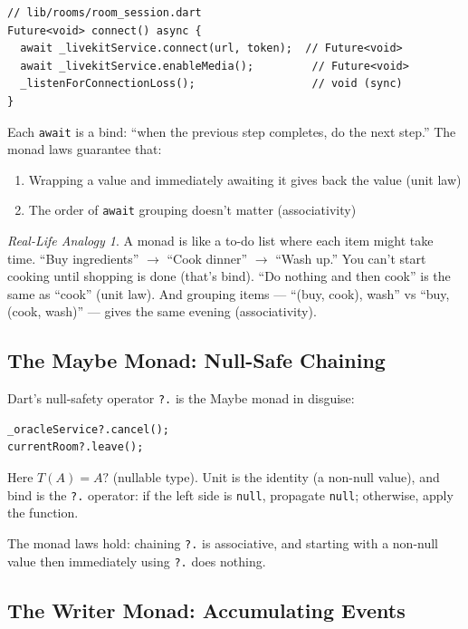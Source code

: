 \documentclass[12pt,a4paper]{article}
\theoremstyle{definition}
\theoremstyle{plain}
\theoremstyle{remark}
\newtheorem*{reallife}{Real-Life Analogy}
\begin{document}
\begin{lstlisting}
// lib/rooms/room_session.dart
Future<void> connect() async {
  await _livekitService.connect(url, token);  // Future<void>
  await _livekitService.enableMedia();         // Future<void>
  _listenForConnectionLoss();                  // void (sync)
}
\end{lstlisting}

Each \texttt{await} is a bind: ``when the previous step completes,
do the next step.'' The monad laws guarantee that:
\begin{enumerate}
  \item Wrapping a value and immediately awaiting it gives back the value
        (unit law)
  \item The order of \texttt{await} grouping doesn't matter (associativity)
\end{enumerate}

\begin{reallife}
A monad is like a to-do list where each item might take time.
``Buy ingredients'' $\to$ ``Cook dinner'' $\to$ ``Wash up.''
You can't start cooking until shopping is done (that's bind).
``Do nothing and then cook'' is the same as ``cook'' (unit law).
And grouping items --- ``(buy, cook), wash'' vs ``buy, (cook, wash)'' ---
gives the same evening (associativity).
\end{reallife}


\subsection{The Maybe Monad: Null-Safe Chaining}

Dart's null-safety operator \texttt{?.} is the Maybe monad in disguise:

\begin{lstlisting}
_oracleService?.cancel();
currentRoom?.leave();
\end{lstlisting}

Here $T(A) = A\texttt{?}$ (nullable type). Unit is the identity (a non-null value),
and bind is the \texttt{?.} operator: if the left side is \texttt{null}, propagate
\texttt{null}; otherwise, apply the function.

The monad laws hold: chaining \texttt{?.} is associative, and starting with a
non-null value then immediately using \texttt{?.} does nothing.


\subsection{The Writer Monad: Accumulating Events}
\label{sec:writer}
\end{document}
